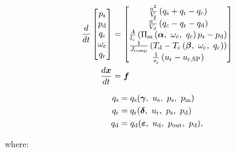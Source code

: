 \begin{equation}
  \begin{split}
    \dt{} \begin{bmatrix}
      p_\text{s}\\
      p_\text{d}\\
      q_\text{c}\\
      \omega_\text{c}\\
      q_\text{r}
    \end{bmatrix} & =
    \begin{bmatrix}
      \frac{a^2}{V_\text{s}}\left(q_\text{s}+q_\text{r}-q_\text{c}\right)\\
      \frac{a^2}{V_\text{d}}\left(q_\text{c}-q_\text{r}-q_\text{d}\right)\\
      \frac{A}{l_\text{c}}\left(\Pi_{\text{ss}}\left(\vc{\alpha},\ \omega_\text{c},\ q_\text{c} \right)p_\text{s} - p_\text{d}  \right)\\
      \frac{1}{J\ut{comp}}\left(T_\text{d} - T_\text{c}\left(\vc{\beta},\ \omega_\text{c},\ q_\text{c}\right)\right)\\
      \frac{1}{\tau_\text{r}}\left(u_\text{r} - u_{\text{r,SP}}\right)
    \end{bmatrix} \\
    \dt{\vc{x}} & = \vc{f}
  \end{split}
  \label{eq:mod:single_comp_states}
\end{equation}

\begin{equation}
  \begin{split}
    q_\text{s} & = q_\text{s}(\vc{\gamma},\ u_{\text{s}},\ p_\text{s},\ p_{\text{in}})\\
    q_\text{r} & = q_\text{r}(\vc{\delta},\ u_\text{r},\ p_\text{s},\ p_\text{d})\\
    q_\text{d} & = q_\text{d}(\vc{\varepsilon},\ u_{\text{d}},\ p_{\text{out}},\ p_\text{d}),
  \end{split}
\end{equation}

where:

